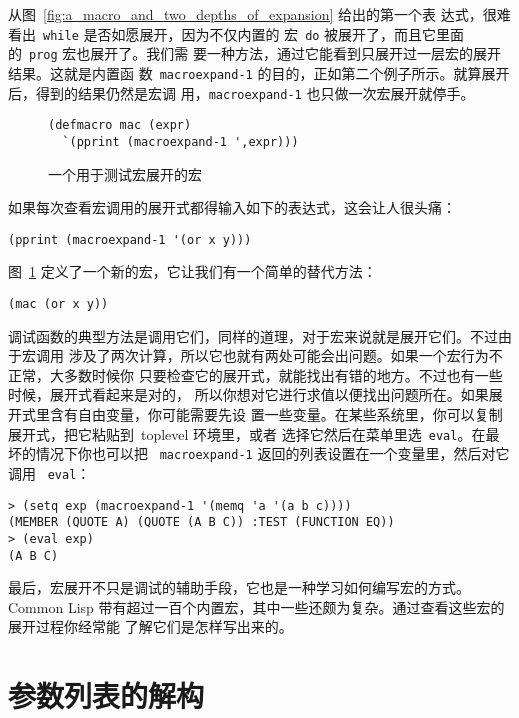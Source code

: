 从图~\ref{fig:a_macro_and_two_depths_of_expansion} 给出的第一个表
达式，很难看出~\texttt{while} 是否如愿展开，因为不仅内置的
宏~\texttt{do} 被展开了，而且它里面的~\texttt{prog} 宏也展开了。我们需
要一种方法，通过它能看到只展开过一层宏的展开结果。这就是内置函
数~\texttt{macroexpand-1}
的目的，正如第二个例子所示。就算展开后，得到的结果仍然是宏调
用，\texttt{macroexpand-1} 也只做一次宏展开就停手。

\begin{figure}
\begin{lstlisting}
(defmacro mac (expr)
  `(pprint (macroexpand-1 ',expr)))
\end{lstlisting}
\caption{\label{fig:a_macro_for_testing_macroexpansion}一个用于测试宏展开的宏}
\end{figure}

如果每次查看宏调用的展开式都得输入如下的表达式，这会让人很头痛：
\begin{lstlisting}
(pprint (macroexpand-1 '(or x y)))
\end{lstlisting}
图~\ref{fig:a_macro_for_testing_macroexpansion} 定义了一个新的宏，它让我们有一个简单的替代方法：
\begin{lstlisting}
(mac (or x y))
\end{lstlisting}

调试函数的典型方法是调用它们，同样的道理，对于宏来说就是展开它们。不过由于宏调用
涉及了两次计算，所以它也就有两处可能会出问题。如果一个宏行为不正常，大多数时候你
只要检查它的展开式，就能找出有错的地方。不过也有一些时候，展开式看起来是对的，
所以你想对它进行求值以便找出问题所在。如果展开式里含有自由变量，你可能需要先设
置一些变量。在某些系统里，你可以复制展开式，把它粘贴到~toplevel 环境里，或者
选择它然后在菜单里选~\texttt{eval}。在最坏的情况下你也可以把
~\texttt{macroexpand-1} 返回的列表设置在一个变量里，然后对它调用
~\texttt{eval}：
\begin{lstlisting}
> (setq exp (macroexpand-1 '(memq 'a '(a b c))))
(MEMBER (QUOTE A) (QUOTE (A B C)) :TEST (FUNCTION EQ))
> (eval exp)
(A B C)
\end{lstlisting}

最后，宏展开不只是调试的辅助手段，它也是一种学习如何编写宏的方式。Common Lisp
带有超过一百个内置宏，其中一些还颇为复杂。通过查看这些宏的展开过程你经常能
了解它们是怎样写出来的。

\section{参数列表的解构}
\label{sec:destructuring_in_parameter_lists}

